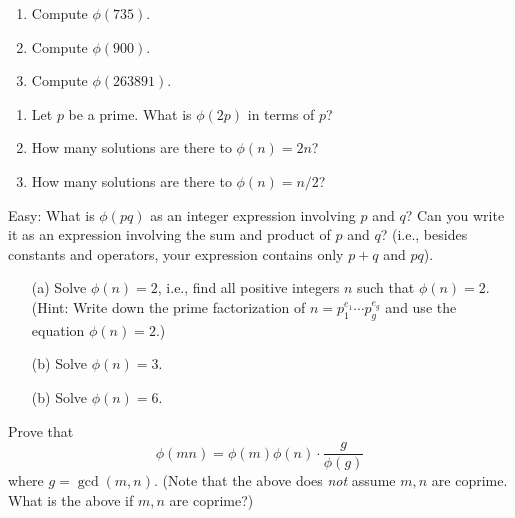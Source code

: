 \begin{ex}
  \mbox{}
  \begin{enumerate}[nosep,label=\textnormal{(\alph*)}]
  \item  Compute $\phi(735)$.
  \item  Compute $\phi(900)$.
  \item  Compute $\phi(263891)$.
  \end{enumerate}
\end{ex}

\begin{ex}
  \begin{enumerate}[nosep,label=\textnormal{(\alph*)}]
  \item  Let $p$ be a prime. What is $\phi(2p)$ in terms of $p$?
  \item  How many solutions are there to $\phi(n) = 2n$?
  \item  How many solutions are there to $\phi(n) = n/2$?    
  \end{enumerate}
\end{ex}


\begin{ex}
  Easy: What is $\phi(pq)$ as an integer expression
  involving $p$ and $q$? Can you write it as an expression
  involving the sum and product of $p$ and $q$? (i.e., besides
  constants and operators, your 
  expression contains only $p+q$ and $pq$).
\end{ex}


\begin{ex}
  \mbox{}
  \begin{enumerate}[nosep]
    \item[(a)]
      Solve $\phi(n) = 2$, i.e., find all positive integers $n$ such that
      $\phi(n) = 2$.
      (Hint: Write down the prime factorization of
      $n = p_1^{e_1}\cdots p_g^{e_g}$ and use the
      equation $\phi(n) = 2$.)
    \item[(b)] Solve $\phi(n) = 3$.
    \item[(b)] Solve $\phi(n) = 6$.
  \end{enumerate}
\end{ex}


\begin{ex}
  Prove that
  \[
  \phi(mn) = \phi(m)\phi(n) \cdot \frac{g}{\phi(g)}
  \]
  where $g = \gcd(m,n)$.
  (Note that the above does \textit{not} assume $m,n$ are coprime.
  What is the above if $m,n$ are coprime?)
\end{ex}


